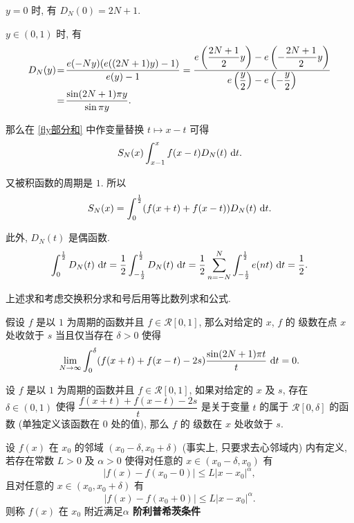 $y=0$ 时, 有 $D_N(0)=2N+1$.

$y\in(0,1)$ 时, 有 $$
\setlength{\arraycolsep}{0.5pt}
\begin{array}{rcl}
	D_N(y) &=& \dfrac{e(-Ny)(e((2N+1)y)-1)}{e(y)-1}=\dfrac{e\left(\dfrac{2N+1}{2}y\right)-e\left(-\dfrac{2N+1}{2}y\right)}{e\left(\dfrac{y}2\right)-e\left(-\dfrac y 2\right)} \\ [10pt]
	&=&\dfrac{\sin(2N+1)\pi y}{\sin\pi y}.
\end{array}$$

那么在 \eqref{fly部分和} 中作变量替换 $t\mapsto x-t$ 可得 $$S_N(x)\int_{x-1}^x f(x-t)D_N(t)\ \text {d} t.$$

又被积函数的周期是 $1$. 所以 \begin{equation}
	S_N(x) = \int_0^{\frac 1 2}(f(x+t)+f(x-t))D_N(t)\ \text {d} t.
\end{equation}

此外, $D_N(t)$ 是偶函数.
\begin{equation}
	\int_0^{\frac 1 2}D_N(t)\ \text {d} t=\frac 1 2\int_{-\frac 1 2}^{\frac 1 2}D_N(t)\ \text {d} t=\frac 1 2\sum\limits_{n=-N}^N\int_{-\frac 1 2}^{\frac 1 2}e(nt)\ \text {d} t=\frac 1 2.
\end{equation}

上述求和考虑交换积分求和号后用等比数列求和公式.

\begin{theorem}[黎曼局部化原理]\label{fly黎曼局部化原理}
	假设 $f$ 是以 $1$ 为周期的函数并且 $f\in\mathscr R[0,1]$, 那么对给定的 $x$, $f$ 的 \fly 级数在点 $x$ 处收敛于 $s$ 当且仅当存在 $\delta>0$ 使得
	\begin{equation}\label{fly黎曼局部化原理式}
		\lim\limits_{N\to\infty}\int_0^{\delta}(f(x+t)+f(x-t)-2s)\frac{\sin(2N+1)\pi t}{t}\ \text {d} t=0.
	\end{equation}
\end{theorem}

\begin{theorem}[迪尼判别法]\label{fly迪尼判别法}
	设 $f$ 是以 $1$ 为周期的函数并且 $f\in\mathscr R[0,1]$, 如果对给定的 $x$ 及 $s$, 存在 $\delta\in(0,1)$ 使得 $\dfrac{f(x+t)+f(x-t)-2s}{t}$ 是关于变量 $t$ 的属于 $\mathscr{R}[0,\delta]$ 的函数 (单独定义该函数在 $0$ 处的值), 那么 $f$ 的 \fly 级数在 $x$ 处收敛于 $s$.
\end{theorem}

\begin{definition}\label{lpxc条件}
	设 $f(x)$ 在 $x_0$ 的邻域 $(x_0-\delta,x_0+\delta)$ (事实上, 只要求去心邻域内) 内有定义, 若存在常数 $L>0$ 及 $\alpha>0$ 使得对任意的 $x\in(x_0-\delta,x_0)$ 有 $$|f(x)-f(x_0-0)|\leqslant L|x-x_0|^\alpha,$$
	且对任意的 $x\in(x_0,x_0+\delta)$ 有 $$|f(x)-f(x_0+0)|\leqslant L|x-x_0|^\alpha.$$ 则称 $f(x)$ 在 $x_0$ 附近满足\textbf{$\alpha$ 阶利普希茨条件}
\end{definition}

